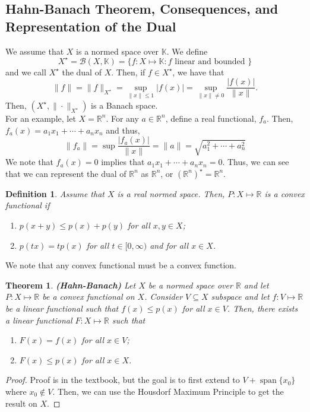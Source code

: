 \documentclass[oneside]{book}
\newtheorem{theorem}{Theorem}
\newtheorem{definition}{Definition}
\newcommand{\R}{{\mathbb R}}
\def\K{\mathbb{K}}
\newcommand{\B}{\mathscr{B}}
\newcommand{\sse}{\subseteq}
\newcommand{\Xs}{X^{\star}}
\DeclareMathOperator*{\spa}{span}
\begin{document}
\subsection*{Hahn-Banach Theorem, Consequences, and Representation of the Dual}
We assume that $X$ is a normed space over $\K$. We define 
\[ \Xs = \B(X, \K) = \{ f: X \mapsto \K : f \text{ linear and bounded } \}\]
and we call $\Xs$ the dual of $X$. Then, if $f \in \Xs$, we have that 
\[ \| f \| = \| f \|_{\Xs} = \sup\limits_{\| x \| \leq 1} |f(x)| = \sup\limits_{\| x \| \neq 0 } \frac{|f(x)|}{\| x \|}.\]
Then, $(\Xs, \| \cdot \|_{\Xs})$ is a Banach space. \\
\indent For an example, let $X = \R^n$. For any $a \in \R^n$, define a real functional, $f_a$. Then, $f_a(x) = a_1 x_1 + \cdots + a_n x_n$ and thus, 
\[\| f_a \| = \sup \frac{|f_a(x)|}{\| x \|} = \| a \| = \sqrt{a_1^2 + \cdots + a_n^2}\]
We note that $f_a(x) = 0$ implies that $a_1 x_1 + \cdots + a_n x_n = 0$. Thus, we can see that we can represent the dual of $\R^n$ as $\R^n$, or $\left( \R^n \right)^{\star} = \R^n$. 
\begin{definition}
Assume that $X$ is a real normed space. Then, $P: X \mapsto \R$ is a convex functional if 
\begin{enumerate}
\item[(i)] $p(x + y) \leq p(x) + p(y) $ for all $x, y \in X$;
\item[(ii)] $p(tx) = tp(x)$ for all $t \in [0, \infty)$ and for all $x \in X$.
\end{enumerate}
\end{definition}
We note that any convex functional must be a convex function.
\begin{theorem}\textbf{(Hahn-Banach)} 
Let $X$ be a normed space over $\R$ and let $P: X \mapsto \R$ be a convex functional on $X$. Consider $V \sse X$ subspace and let $f: V \mapsto \R$ be a linear functional such that $f(x) \leq p(x)$ for all $x \in V$. Then, there exists a linear functional $F: X \mapsto \R$ such that 
\begin{enumerate}
\item[(i)] $F(x) = f(x)$ for all $x \in V$;
\item[(ii)] $F(x) \leq p(x)$ for all $x \in X$. 
\end{enumerate}
\end{theorem}
\begin{proof}
Proof is in the textbook, but the goal is to first extend to $V + \spa\{ x_0 \}$ where $x_0 \not\in V$. Then, we can use the Housdorf Maximum Principle to get the result on $X$. 
\end{proof}
\end{document}
